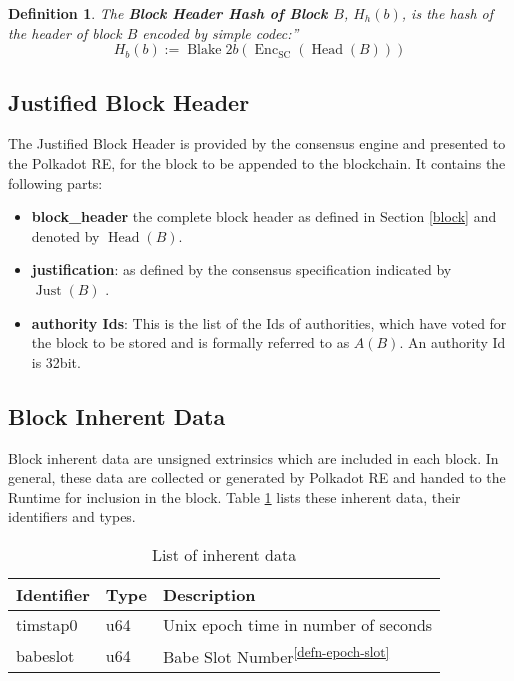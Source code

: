 \documentclass{article}
\newcommand{\assign}{:=}
\newcommand{\tmop}[1]{\ensuremath{\operatorname{#1}}}
\newcommand{\tmrsup}[1]{\textsuperscript{#1}}
\newcommand{\tmsamp}[1]{\textsf{#1}}
\newcommand{\tmstrong}[1]{\textbf{#1}}
\newcommand{\tmtextbf}[1]{{\bfseries{#1}}}
\newcommand{\tmtextsf}[1]{{\sffamily{#1}}}
\newtheorem{definition}{Definition}
\providecommand{\tmop}[1]{\ensuremath{\mathrm{#1}}}
\providecommand{\tmsamp}[1]{\tmtextsf{#1}}
\providecommand{\tmstrong}[1]{\tmtextbf{#1}}
\providecommand{\tmtextbf}[1]{\tmtextbf{#1}}
\newtheorem{definition}{Definition}
\begin{document}
\begin{definition}
  \label{defn-block-header-hash}The {\tmstrong{Block Header Hash of Block
  $B$}}, {\tmstrong{$H_h (b)$}}, is the hash of the header of block $B$
  encoded by simple codec:''
  \[ H_b (b) \assign \tmop{Blake} 2 b (\tmop{Enc}_{\tmop{SC}} (\tmop{Head}
     (B))) \]
\end{definition}

\subsection{Justified Block Header}

The Justified Block Header is provided by the consensus engine and presented
to the Polkadot RE, for the block to be appended to the blockchain. It
contains the following parts:
\begin{itemize}
  \item {\tmstrong{{\tmsamp{{\tmstrong{block\_header}}}}}} the complete block
  header as defined in Section \ref{block} and denoted by $\tmop{Head} (B)$.
  
  \item {\tmstrong{{\tmsamp{justification}}}}: as defined by the consensus
  specification indicated by $\tmop{Just} (B)$ {}.
  
  \item {\tmstrong{{\tmsamp{authority Ids}}}}: This is the list of the Ids of
  authorities, which have voted for the block to be stored and is formally
  referred to as $A (B)$. An authority Id is 32bit.
\end{itemize}

\subsection{Block Inherent Data}

Block inherent data are unsigned extrinsics which are included in each block.
In general, these data are collected or generated by Polkadot RE and handed to
the Runtime for inclusion in the block. Table \ref{tabl-inherent-data} lists
these inherent data, their identifiers and types.

\begin{table}[h]
  \begin{tabular}{lll}
    \hline
    Identifier & Type  & Description\\
    \hline
    timstap0 & u64 & Unix epoch time in number of seconds\\
    babeslot & u64 & Babe Slot Number\tmrsup{\ref{defn-epoch-slot}}\\
    \hline
  \end{tabular}
  \caption{\label{tabl-inherent-data}List of inherent data}
\end{table}
\end{document}
